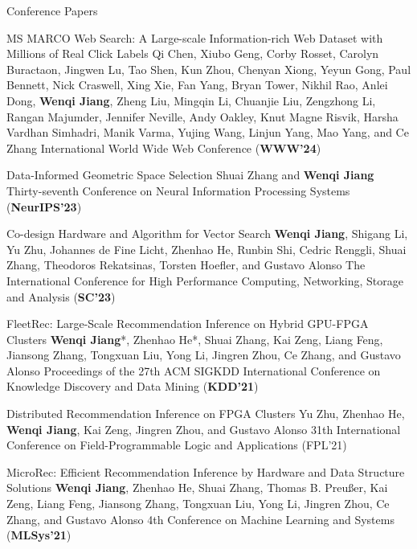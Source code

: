 \begin{rSection}{Conference Papers}
\begin{enumerate}[label={[\arabic*]}]
\item 
\begin{Pub}{MS MARCO Web Search: A Large-scale Information-rich Web Dataset with Millions of Real Click Labels}
{Qi Chen, Xiubo Geng, Corby Rosset, Carolyn Buractaon, Jingwen Lu, Tao Shen, Kun Zhou, Chenyan Xiong, Yeyun Gong, Paul Bennett, Nick Craswell, Xing Xie, Fan Yang, Bryan Tower, Nikhil Rao, Anlei Dong, \textbf{Wenqi Jiang}, Zheng Liu, Mingqin Li, Chuanjie Liu, Zengzhong Li, Rangan Majumder, Jennifer Neville, Andy Oakley, Knut Magne Risvik, Harsha Vardhan Simhadri, Manik Varma, Yujing Wang, Linjun Yang, Mao Yang, and Ce Zhang}
{International World Wide Web Conference (\textbf{WWW'24})}
\end{Pub}

\item 
\begin{Pub}{Data-Informed Geometric Space Selection}
{Shuai Zhang and \textbf{Wenqi Jiang}}
{Thirty-seventh Conference on Neural Information Processing Systems (\textbf{NeurIPS'23})}
\end{Pub}

\item 
\begin{Pub}{Co-design Hardware and Algorithm for Vector Search}
{\textbf{Wenqi Jiang}, Shigang Li, Yu Zhu, Johannes de Fine Licht, Zhenhao He, Runbin Shi, Cedric Renggli, Shuai Zhang, Theodoros Rekatsinas, Torsten Hoefler, and Gustavo Alonso}
{The International Conference for High Performance Computing, Networking, Storage and Analysis (\textbf{SC'23})}
\end{Pub}

\item 
\begin{Pub}{FleetRec: Large-Scale Recommendation Inference on Hybrid GPU-FPGA Clusters}
{\textbf{Wenqi Jiang}*, Zhenhao He*, Shuai Zhang, Kai Zeng, Liang Feng, Jiansong Zhang, Tongxuan Liu, Yong Li, Jingren Zhou, Ce Zhang, and Gustavo Alonso}
{Proceedings of the 27th ACM SIGKDD International Conference on Knowledge Discovery and Data Mining (\textbf{KDD'21})}
\end{Pub}

\item 
\begin{Pub}{Distributed Recommendation Inference on FPGA Clusters}
{Yu Zhu, Zhenhao He, \textbf{Wenqi Jiang}, Kai Zeng, Jingren Zhou, and Gustavo Alonso}
{31th International Conference on Field-Programmable Logic and Applications (FPL'21)}
\end{Pub}

\item 
\begin{Pub}{MicroRec: Efficient Recommendation Inference by Hardware and Data Structure Solutions}
{\textbf{Wenqi Jiang}, Zhenhao He, Shuai Zhang, Thomas B. Preußer, Kai Zeng, Liang Feng, Jiansong Zhang, Tongxuan Liu, Yong Li, Jingren Zhou, Ce Zhang, and Gustavo Alonso}
{4th Conference on Machine Learning and Systems (\textbf{MLSys'21})}
\end{Pub}\end{enumerate}
\end{rSection}



